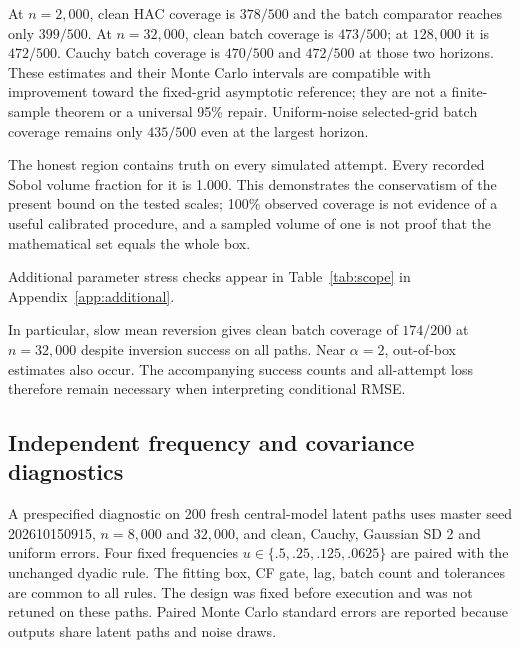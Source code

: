 \documentclass[11pt,a4paper]{article}
\theoremstyle{remark}\newtheorem{remark}[theorem]{Remark}
\begin{document}
At $n=2{,}000$, clean HAC coverage is $378/500$ and the batch comparator reaches only $399/500$. At $n=32{,}000$, clean batch coverage is $473/500$; at $128{,}000$ it is $472/500$. Cauchy batch coverage is $470/500$ and $472/500$ at those two horizons. These estimates and their Monte Carlo intervals are compatible with improvement toward the fixed-grid asymptotic reference; they are not a finite-sample theorem or a universal 95\% repair. Uniform-noise selected-grid batch coverage remains only $435/500$ even at the largest horizon.

The honest region contains truth on every simulated attempt. Every recorded Sobol volume fraction for it is 1.000. This demonstrates the conservatism of the present bound on the tested scales; 100\% observed coverage is not evidence of a useful calibrated procedure, and a sampled volume of one is not proof that the mathematical set equals the whole box.

Additional parameter stress checks appear in Table~\ref{tab:scope} in Appendix~\ref{app:additional}.

In particular, slow mean reversion gives clean batch coverage of $174/200$ at $n=32{,}000$ despite inversion success on all paths. Near $\alpha=2$, out-of-box estimates also occur. The accompanying success counts and all-attempt loss therefore remain necessary when interpreting conditional RMSE.

\subsection{Independent frequency and covariance diagnostics}\label{sec:newnumerics}
A prespecified diagnostic on 200 fresh central-model latent paths uses master seed 202610150915, $n=8{,}000$ and $32{,}000$, and clean, Cauchy, Gaussian SD 2 and uniform errors. Four fixed frequencies $u\in\{.5,.25,.125,.0625\}$ are paired with the unchanged dyadic rule. The fitting box, CF gate, lag, batch count and tolerances are common to all rules. The design was fixed before execution and was not retuned on these paths. Paired Monte Carlo standard errors are reported because outputs share latent paths and noise draws.
\end{document}
